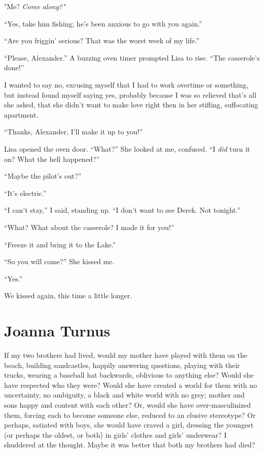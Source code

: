 "Me? \emph{Come along?"}

``Yes, take him fishing; he's been anxious to go with you again.''

``Are you friggin' serious? That was the worst week of my life.''

``Please, Alexander.'' A buzzing oven timer prompted Lisa to rise. ``The
casserole's done!''

I wanted to say no, excusing myself that I had to work overtime or
something, but instead found myself saying yes, probably because I was
so relieved that's all she asked, that she didn't want to make love
right then in her stifling, suffocating apartment.

``Thanks, Alexander, I'll make it up to you!''

Lisa opened the oven door. ``What?'' She looked at me, confused. ``I
\emph{did} turn it on? What the hell happened?''

``Maybe the pilot's out?''

``It's electric.''

``I can't stay,'' I said, standing up. ``I don't want to see Derek. Not
tonight.''

``What? What about the casserole? I made it for you!''

``Freeze it and bring it to the Lake.''

``So you will come?'' She kissed me.

``Yes.''

We kissed again, this time a little longer.

\chapter{Joanna Turnus}

\titlemark

If my two brothers had lived, would my mother have played with them on
the beach, building sandcastles, happily answering questions, playing
with their trucks, wearing a baseball hat backwards, oblivious to
anything else? Would she have respected who they were? Would she have
created a world for them with no uncertainty, no ambiguity, a black and
white world with no grey; mother and sons happy and content with each
other? Or, would she have over-masculinized them, forcing each to become
someone else, reduced to an elusive stereotype? Or perhaps, satiated
with boys, she would have craved a girl, dressing the youngest (or
perhaps the oldest, or both) in girls' clothes and girls' underwear? I
shuddered at the thought. Maybe it was better that both my brothers had
died?

